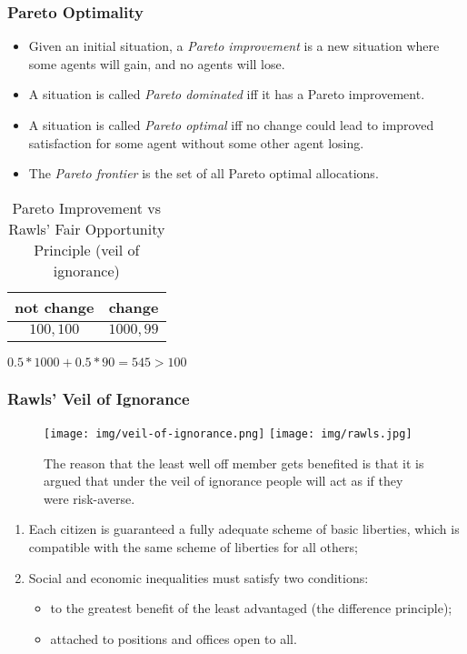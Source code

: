 \documentclass[UTF8,11pt,colorlinks,compress,openany]{beamer}%
\begin{document}
\begin{frame}\frametitle{Pareto Optimality}
\vspace*{-1ex}
\begin{center}
\end{center}\vspace*{-1ex}
\begin{itemize}
	\item Given an initial situation, a \emph{Pareto improvement} is a new situation where some agents will gain, and no agents will lose.
	\item A situation is called \emph{Pareto dominated} iff it has a Pareto improvement.
	\item A situation is called \emph{Pareto optimal} iff no change could lead to improved satisfaction for some agent without some other agent losing.
	\item The \emph{Pareto frontier} is the set of all Pareto optimal allocations.
\end{itemize}
\begin{table}
\begin{tabu}{c|c}
\hline
not change & change\\
\hline
$100,100$ & $1000,99$\\
\hline
\end{tabu}\caption{Pareto Improvement vs Rawls' Fair Opportunity Principle (veil of ignorance)}
$0.5*1000+0.5*90=545>100$
\end{table}
\end{frame}

\begin{frame}\frametitle{Rawls' Veil of Ignorance}
\begin{figure}[H]
\texttt{[image: img/veil-of-ignorance.png]}
\texttt{[image: img/rawls.jpg]}\caption{The reason that the least well off member gets benefited is that it is argued that under the veil of ignorance people will act as if they were risk-averse.}
\end{figure}
\begin{enumerate}
	\item Each citizen is guaranteed a fully adequate scheme of basic liberties, which is compatible with the same scheme of liberties for all others;
	\item Social and economic inequalities must satisfy two conditions:
	\begin{itemize}
		\item to the greatest benefit of the least advantaged (the difference principle);
		\item attached to positions and offices open to all.
	\end{itemize}
\end{enumerate}
\end{frame}
\end{document}
